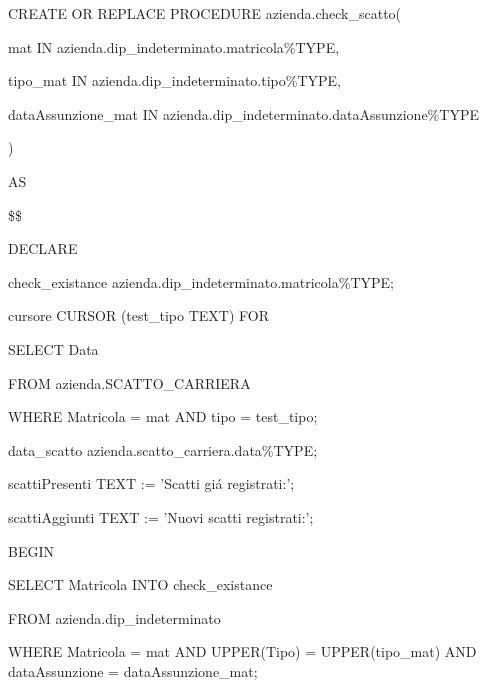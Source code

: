             \begin{flushleft}
                \begin{description}
                    \item CREATE OR REPLACE PROCEDURE azienda.check\_scatto(
                        \begin{description}
                            \item mat IN azienda.dip\_indeterminato.matricola\%TYPE,
                            \item tipo\_mat IN azienda.dip\_indeterminato.tipo\%TYPE,
                            \item dataAssunzione\_mat IN azienda.dip\_indeterminato.dataAssunzione\%TYPE
                        \end{description}
                        )  
                    \item AS
                    \item \$\$
                    \item DECLARE
                    \begin{description}
                        \item check\_existance azienda.dip\_indeterminato.matricola\%TYPE;

                        \item cursore CURSOR (test\_tipo TEXT) FOR
                        \begin{description}
                            \item SELECT Data
                            \item FROM azienda.SCATTO\_CARRIERA
                            \item WHERE Matricola = mat AND tipo = test\_tipo;
                        \end{description}
                        \item data\_scatto azienda.scatto\_carriera.data\%TYPE;
                    
                        \item scattiPresenti TEXT := 'Scatti gi\'a registrati:';
                        \item scattiAggiunti TEXT := 'Nuovi scatti registrati:';
                    \end{description}
                    \item BEGIN 
                    \begin{description}
                        \item SELECT Matricola INTO check\_existance
                        \item FROM azienda.dip\_indeterminato
                        \item WHERE Matricola = mat AND UPPER(Tipo) = UPPER(tipo\_mat) AND dataAssunzione = dataAssunzione\_mat;


\end{description}
\end{description}
\end{flushleft}

